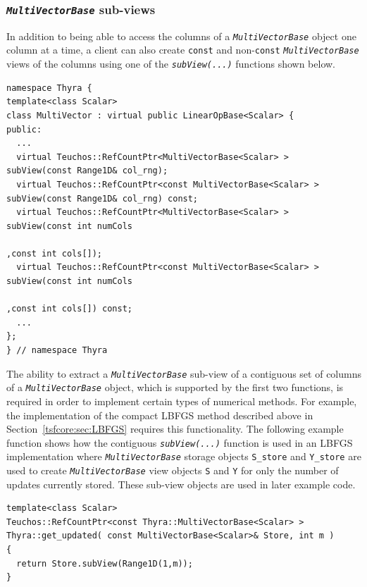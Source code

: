 \documentclass[pdf,ps2pdf,11pt]{SANDreport}
\begin{document}
\subsubsection{\texttt{\textit{Multi\-Vector\-Base}} sub-views}
%

In addition to being able to access the columns of a
{}\texttt{\textit{Multi\-Vector\-Base}} object one column at a time, a client
can also create {}\texttt{const} and non-\texttt{const}
{}\texttt{\textit{Multi\-Vector\-Base}} views of the columns
using one of the {}\texttt{\textit{subView(...)}} functions shown below.

{\scriptsize\begin{verbatim}
namespace Thyra {
template<class Scalar>
class MultiVector : virtual public LinearOpBase<Scalar> {
public:
  ...
  virtual Teuchos::RefCountPtr<MultiVectorBase<Scalar> >       subView(const Range1D& col_rng);
  virtual Teuchos::RefCountPtr<const MultiVectorBase<Scalar> > subView(const Range1D& col_rng) const;
  virtual Teuchos::RefCountPtr<MultiVectorBase<Scalar> >       subView(const int numCols
                                                                        ,const int cols[]);
  virtual Teuchos::RefCountPtr<const MultiVectorBase<Scalar> > subView(const int numCols
                                                                        ,const int cols[]) const;
  ...
};
} // namespace Thyra
\end{verbatim}}

{}\noindent{}The ability to extract a {}\texttt{\textit{Multi\-Vector\-Base}}
sub-view of a contiguous set of columns of a
{}\texttt{\textit{Multi\-Vector\-Base}} object, which is supported by the
first two functions, is required in order to implement certain types of
numerical methods.  For example, the implementation of the compact LBFGS
method described above in Section~\ref{tsfcore:sec:LBFGS} requires this
functionality.  The following example function shows how the contiguous
{}\texttt{\textit{subView(...)}} function is used in an LBFGS implementation
where {}\texttt{\textit{Multi\-Vector\-Base}} storage objects
{}\texttt{S\_store} and {}\texttt{Y\_store} are used to create
{}\texttt{\textit{Multi\-Vector\-Base}} view objects {}\texttt{S} and
{}\texttt{Y} for only the number of updates currently stored.  These sub-view
objects are used in later example code.

{\scriptsize\begin{verbatim}
template<class Scalar>
Teuchos::RefCountPtr<const Thyra::MultiVectorBase<Scalar> >
Thyra::get_updated( const MultiVectorBase<Scalar>& Store, int m )
{
  return Store.subView(Range1D(1,m));
}
\end{verbatim}}
\end{document}

